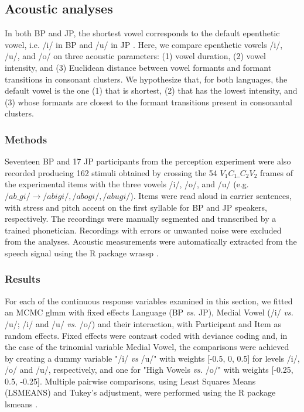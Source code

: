 \subsection{Acoustic analyses}

In both BP and JP, the shortest vowel corresponds to the default epenthetic vowel, i.e. /i/ in BP \cite{escudero2009} and /u/ in JP \cite{han1962}. Here, we compare epenthetic vowels /i/, /u/, and /o/ on three acoustic parameters: (1) vowel duration, (2) vowel intensity, and (3) Euclidean distance between vowel formants and formant transitions in consonant clusters. We hypothesize that, for both languages, the default vowel is the one (1) that is shortest, (2) that has the lowest intensity, and (3) whose formants are closest to the formant transitions present in consonantal clusters.       

\subsubsection{Methods}

Seventeen BP and 17 JP participants from the perception experiment were also recorded producing 162 stimuli obtained by crossing the 54 $V_{1}C_{1}\_C_{2}V_{2}$ frames of the experimental items with the three vowels /i/, /o/, and /u/ (e.g. $/ab\_gi/ \rightarrow /abigi/, /abogi/, /abugi/$).
Items were read aloud in carrier sentences, with stress and pitch accent on the first syllable for BP and JP speakers, respectively. The recordings were manually segmented and transcribed by a trained phonetician. Recordings with errors or unwanted noise were excluded from the analyses. Acoustic measurements were automatically extracted from the speech signal using the R package wrassp \cite{R-wrassp}.

\subsubsection{Results}

For each of the continuous response variables examined in this section, we fitted an MCMC glmm with fixed effects Language (BP \textit{vs.} JP), Medial Vowel (/i/ \textit{vs.} /u/; /i/ and /u/ \textit{vs.} /o/) and their interaction, with Participant and Item as random effects. Fixed effects were contrast coded with deviance coding and, in the case of the trinomial variable Medial Vowel, the comparisons were achieved by creating a dummy variable "/i/ \textit{vs} /u/" with weights [-0.5, 0, 0.5] for levels /i/, /o/ and /u/, respectively, and one for "High Vowels \textit{vs.} /o/" with weights [-0.25, 0.5, -0.25]. Multiple pairwise comparisons, using Least Squares Means (LSMEANS) and Tukey's adjustment, were performed using the R package lsmeans \cite{R-lsmeans}.

